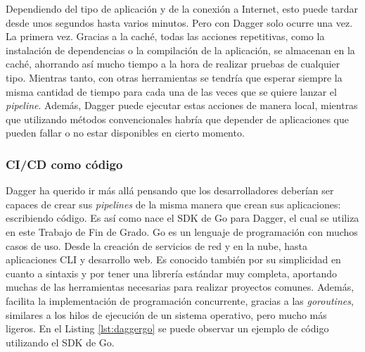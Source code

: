 Dependiendo del tipo de aplicación y de la conexión a Internet, esto puede tardar desde unos segundos hasta varios minutos. Pero con Dagger solo ocurre una vez. La primera vez. Gracias a la caché, todas las acciones repetitivas, como la instalación de dependencias o la compilación de la aplicación, se almacenan en la caché, ahorrando así mucho tiempo a la hora de realizar pruebas de cualquier tipo. Mientras tanto, con otras herramientas se tendría que esperar siempre la misma cantidad de tiempo para cada una de las veces que se quiere lanzar el \textit{pipeline}. Además, Dagger puede ejecutar estas acciones de manera local, mientras que utilizando métodos convencionales habría que depender de aplicaciones que pueden fallar o no estar disponibles en cierto momento.

\subsubsection*{CI/CD como código}
\label{subsec:cicd-code}

Dagger ha querido ir más allá pensando que los desarrolladores deberían ser capaces de crear sus \textit{pipelines} de la misma manera que crean sus aplicaciones: escribiendo código. Es así como nace el SDK de Go\cite{go} para Dagger, el cual se utiliza en este Trabajo de Fin de Grado. Go es un lenguaje de programación con muchos casos de uso. Desde la creación de servicios de red y en la nube, hasta aplicaciones CLI y desarrollo web. Es conocido también por su simplicidad en cuanto a sintaxis y por tener una librería estándar muy completa, aportando muchas de las herramientas necesarias para realizar proyectos comunes. Además, facilita la implementación de programación concurrente, gracias a las \textit{goroutines}, similares a los hilos de ejecución de un sistema operativo, pero mucho más ligeros. En el Listing \ref{lst:daggergo} se puede observar un ejemplo de código utilizando el SDK de Go.

